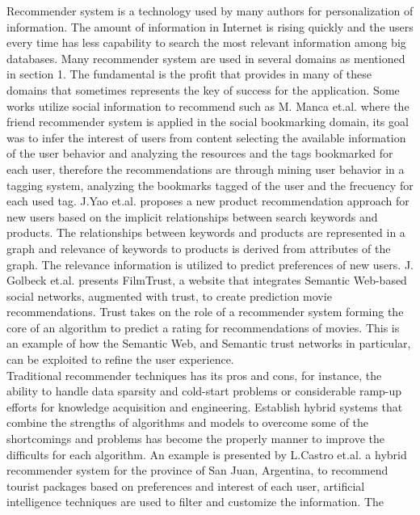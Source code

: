 Recommender system is a technology used by many authors for
personalization of information. The amount of information in Internet
is rising quickly and the users every time has less capability to
search the most relevant information among big databases. Many
recommender  system are used in several domains as mentioned in
section 1. The fundamental is the profit that provides in many of
these domains that sometimes represents the key of success for the
application.  Some works utilize social information to recommend such
as M. Manca et.al. \cite{manca2014mining} where the friend recommender
system is applied in the social bookmarking domain, its goal was to
infer the interest of users from content selecting the available
information of the user behavior and analyzing the resources and the
tags bookmarked for each user, therefore the recommendations are
through mining user behavior in a tagging system, analyzing the
bookmarks tagged of the user and the frecuency for each used tag. 
J.Yao et.al. \cite{yao2012product} proposes a new product recommendation
approach for new users based on the implicit relationships between
search keywords and products. The relationships between keywords and
products are represented in a graph and relevance of keywords to
products is derived from attributes of the graph. The relevance
information is utilized to predict preferences of new users. J.
Golbeck et.al.\cite{golbeck2006filmtrust} presents FilmTrust, a
website that integrates Semantic Web-based social networks, augmented
with trust, to create prediction movie recommendations. Trust takes on
the role of a recommender system forming the core of an algorithm to
predict a rating for recommendations of movies. This is an example of
how the Semantic Web, and Semantic trust networks in particular, can
be exploited to refine the user experience. \\  
Traditional recommender techniques has its pros and cons, for
instance, the ability to handle data sparsity and cold-start problems
or considerable ramp-up efforts for knowledge acquisition and
engineering. Establish hybrid systems that combine the strengths of
algorithms and models to overcome some of the shortcomings and
problems has become the properly manner to improve the difficults for
each algorithm.
An example is presented by L.Castro et.al.\cite{castro2012prototype} 
a hybrid recommender system for the province of San Juan, Argentina, 
to recommend tourist packages  based on preferences and interest 
of each user, artificial intelligence
techniques are used to filter and customize the information. The
